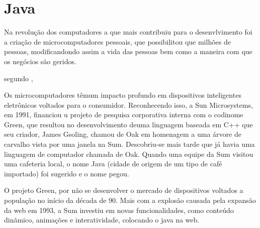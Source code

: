 










\section{Java}

\par  Na revolução dos computadores a que mais contribuiu para o desenvlvimento
foi a criação de microcomputadores pessoais, que possibilitou que milhões de
pessoas, modificandondo assim a vida das pessoas bem como a maneira com que os
negócios são geridos.

\par segundo ,

\begin{citacao}
	Os microcomputadores têmum impacto profundo em dispositivos inteligentes
	eletrônicos voltados para o consumidor. Reconhecendo isso, a Sun Microsystems,
	em 1991, financiou u projeto de pesquisa corporativa interna com o codinome
	Green, que resultou no desenvolvimento deuma linguagem baseada em C++ que seu
	criador, James Gsoling, chamou de Oak em homenagem a uma árvore de carvalho
	vista por uma janela na Sum. Descobriu-se mais tarde que já havia uma linguagem
	de computador chamada de Oak. Quando uma equipe da Sum visitou uma cafeteria
	local, o nome Java (cidade de origem de um tipo de café importado) foi sugerido
	e o nome pegou.
\end{citacao}

\par O projeto Green, por não se desenvolver o mercado de dispositivos voltados
a população no início da década de 90. Mais com a explosão causada pela expansão
da web em 1993, a Sum investiu em novas funcionalidades, como conteúdo dinãmico,
animações e interatividade, colocando o java na web.

